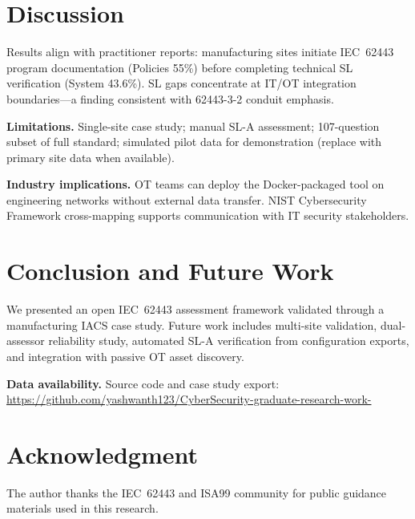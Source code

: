 \documentclass[conference]{IEEEtran}
\begin{document}
\section{Discussion}
Results align with practitioner reports: manufacturing sites initiate IEC~62443 program documentation (Policies 55\%) before completing technical SL verification (System 43.6\%). SL gaps concentrate at IT/OT integration boundaries---a finding consistent with 62443-3-2 conduit emphasis.

\textbf{Limitations.} Single-site case study; manual SL-A assessment; 107-question subset of full standard; simulated pilot data for demonstration (replace with primary site data when available).

\textbf{Industry implications.} OT teams can deploy the Docker-packaged tool on engineering networks without external data transfer. NIST Cybersecurity Framework cross-mapping supports communication with IT security stakeholders.

\section{Conclusion and Future Work}
We presented an open IEC~62443 assessment framework validated through a manufacturing IACS case study. Future work includes multi-site validation, dual-assessor reliability study, automated SL-A verification from configuration exports, and integration with passive OT asset discovery.

\textbf{Data availability.} Source code and case study export: \url{https://github.com/yashwanth123/CyberSecurity-graduate-research-work-}

\section*{Acknowledgment}
The author thanks the IEC~62443 and ISA99 community for public guidance materials used in this research.



\end{document}
